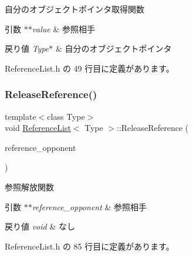 自分のオブジェクトポインタ取得関数 


\begin{DoxyParams}{引数}
{\em $\ast$$\ast$value} & 参照相手 \\
\hline
\end{DoxyParams}

\begin{DoxyRetVals}{戻り値}
{\em Type$\ast$} & 自分のオブジェクトポインタ \\
\hline
\end{DoxyRetVals}


 Reference\+List.\+h の 49 行目に定義があります。

\mbox{\label{class_reference_list_a56ce3eb1b8a5b80325dd99a2e4d767c6}} 
\subsubsection{\texorpdfstring{Release\+Reference()}{ReleaseReference()}}
{\footnotesize\ttfamily template$<$class Type$>$ \\
void \mbox{\hyperlink{class_reference_list}{Reference\+List}}$<$ Type $>$\+::Release\+Reference (\begin{DoxyParamCaption}\item[{Type $\ast$$\ast$}]{reference\+\_\+opponent }\end{DoxyParamCaption})\hspace{0.3cm}{\ttfamily [inline]}}



参照解放関数 


\begin{DoxyParams}{引数}
{\em $\ast$$\ast$reference\+\_\+opponent} & 参照相手 \\
\hline
\end{DoxyParams}

\begin{DoxyRetVals}{戻り値}
{\em void} & なし \\
\hline
\end{DoxyRetVals}


 Reference\+List.\+h の 85 行目に定義があります。

\mbox{\label{class_reference_list_ab7e9c83c0d79b4a9d62c4e678243e632}} 
